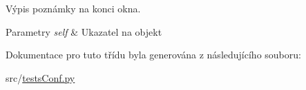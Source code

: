 Výpis poznámky na konci okna. 


\begin{DoxyParams}{Parametry}
{\em self} & Ukazatel na objekt \\
\hline
\end{DoxyParams}


Dokumentace pro tuto třídu byla generována z následujícího souboru\-:\begin{DoxyCompactItemize}
\item 
src/\hyperlink{testsConf_8py}{tests\-Conf.\-py}\end{DoxyCompactItemize}

